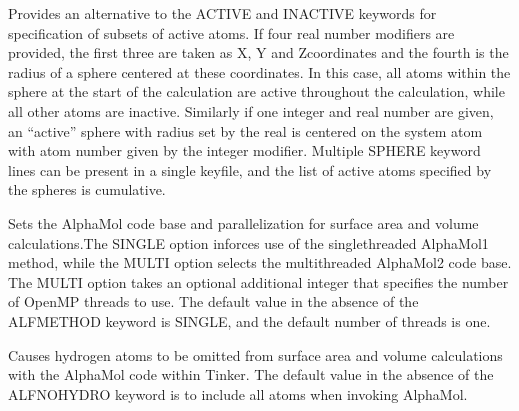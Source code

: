 \documentclass[letterpaper,11pt,english]{sphinxmanual}
\begin{document}
\ignorespaces {}\label{\detokenize{text/keywords:key-active-sphere}}\begin{description}
\sphinxAtStartPar
Provides an alternative to the ACTIVE and INACTIVE keywords for specification of subsets of active atoms. If four real number modifiers are provided, the first three are taken as X\sphinxhyphen{}, Y\sphinxhyphen{} and Z\sphinxhyphen{}coordinates and the fourth is the radius of a sphere centered at these coordinates. In this case, all atoms within the sphere at the start of the calculation are active throughout the calculation, while all other atoms are inactive. Similarly if one integer and real number are given, an “active” sphere with radius set by the real is centered on the system atom with atom number given by the integer modifier. Multiple SPHERE keyword lines can be present in a single keyfile, and the list of active atoms specified by the spheres is cumulative.

\end{description}

\ignorespaces {}\label{\detokenize{text/keywords:key-alf-method}}\begin{description}
\sphinxAtStartPar
Sets the AlphaMol code base and parallelization for surface area and volume calculations.The SINGLE option inforces use of the single\sphinxhyphen{}threaded AlphaMol1 method, while the MULTI option selects the multi\sphinxhyphen{}threaded AlphaMol2 code base. The MULTI option takes an optional additional integer that specifies the number of OpenMP threads to use. The default value in the absence of the ALF\sphinxhyphen{}METHOD keyword is SINGLE, and the default number of threads is one.

\end{description}

\ignorespaces {}\label{\detokenize{text/keywords:key-alf-nohydro}}\begin{description}
\sphinxAtStartPar
Causes hydrogen atoms to be omitted from surface area and volume calculations with the AlphaMol code within Tinker. The default value in the absence of the ALF\sphinxhyphen{}NOHYDRO keyword is to include all atoms when invoking AlphaMol.

\end{description}
\end{document}
